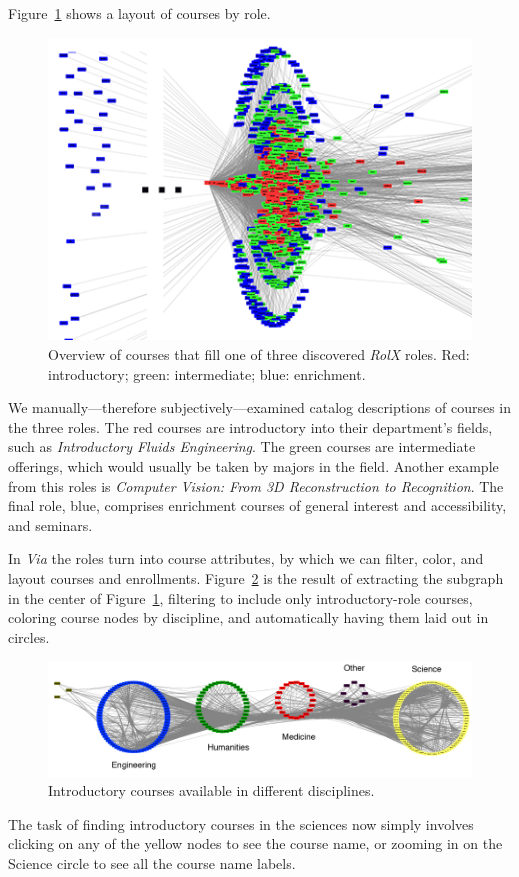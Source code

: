 Figure~\ref{fig:rolxOverview} shows a layout of courses by role.
\begin{figure}
    \centering
    \includegraphics{Figs/rolxOverviewCropped2PhotoshopCroppedDoctoredWhite.png}
    \caption{Overview of courses that fill one of three discovered
      {\em RolX} roles. Red: introductory; green: intermediate; blue:
      enrichment.}
    \label{fig:rolxOverview}
\end{figure}
We manually---therefore subjectively---examined catalog descriptions
of courses in the three roles. The red courses are introductory into
their department's fields, such as {\em Introductory Fluids
  Engineering}. The green courses are intermediate offerings, which
would usually be taken by majors in the field. Another example from
this roles is {\em Computer Vision: From 3D Reconstruction to
  Recognition}. The final role, blue, comprises enrichment courses of
general interest and accessibility, and seminars.

In {\em Via} the roles turn into course attributes, by which we can
filter, color, and layout courses and
enrollments. Figure~\ref{fig:rolxIntroCourses} is the result of extracting
the subgraph in the center of Figure~\ref{fig:rolxOverview},
filtering to include only introductory-role courses, coloring course
nodes by discipline, and automatically having them laid out in
circles.
\begin{figure}
    \centering
    \includegraphics[width=\textwidth]{Figs/rolxIntroCoursesByDepartmentCropped.pdf}
    \caption{Introductory courses available in different disciplines.}
    \label{fig:rolxIntroCourses}
\end{figure}
The task of finding introductory courses in the sciences now simply
involves clicking on any of the yellow nodes to see the course name,
or zooming in on the Science circle to see all the course name labels.

